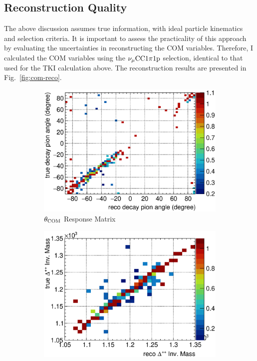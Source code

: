      \subsection{Reconstruction Quality}
     \label{sec:com-reco}
     The above discussion assumes true information, with ideal particle kinematics and selection criteria. It is important to assess the practicality of this approach by evaluating the uncertainties in reconstructing the COM variables. Therefore, I calculated the COM variables using the $\nu_{\mu}\textrm{CC}1\pi1\textrm{p}$ selection, identical to that used for the TKI calculation above. The reconstruction results are presented in Fig.~\ref{fig:com-reco}.
     \begin{figure}
          \begin{subfigure}[b]{\dbfigwid\textwidth}
               \centering
               \includegraphics[width=\textwidth]{figures/COM/SFGpTPCmu_dang_colnor_resmat_al15.eps}
               \caption{$\theta_{\textrm{COM}}$ Response Matrix}
               \label{subfig:reco-com-t-resmat}
          \end{subfigure}         
          \begin{subfigure}[b]{\dbfigwid\textwidth}
               \centering
               \includegraphics[width=\textwidth]{figures/COM/SFGpTPCmu_edelta_colnor_resmat_al15.eps}

\end{subfigure}
\end{figure}
